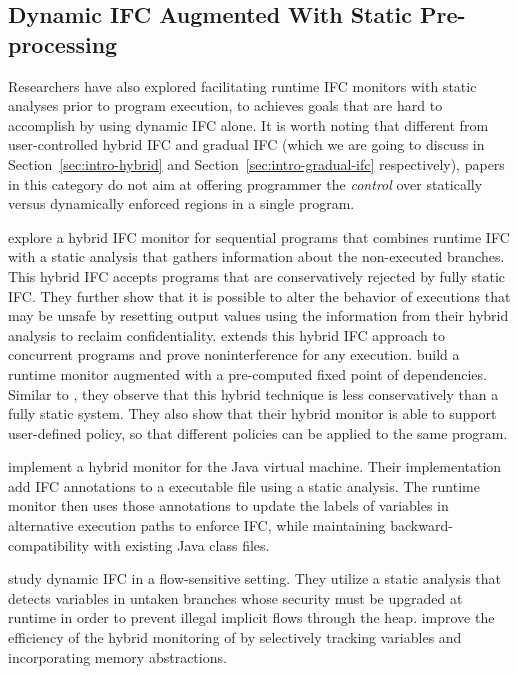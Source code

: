 \subsection{Dynamic IFC Augmented With Static Pre-processing}
\label{sec:intro-dyn-static}

Researchers have also explored facilitating runtime IFC monitors with static
analyses prior to program execution, to achieves goals that are hard to
accomplish by using dynamic IFC alone. It is worth noting that different from
user-controlled hybrid IFC and gradual IFC (which we are going to discuss in
Section~\ref{sec:intro-hybrid} and Section~\ref{sec:intro-gradual-ifc}
respectively), papers in this category do not aim at offering programmer the
\emph{control} over statically versus dynamically enforced regions in a single
program.

\textcite{le2005monitoring} explore a
hybrid IFC monitor for sequential programs that combines runtime IFC with a
static analysis that gathers information about the non-executed branches. This
hybrid IFC accepts programs that are conservatively rejected by fully static
IFC. They further show that it is possible to alter the behavior of executions
that may be unsafe by resetting output values using the information from their
hybrid analysis to reclaim confidentiality. \textcite{le2007automaton} extends
this hybrid IFC approach to concurrent programs and prove noninterference for
any execution. \textcite{Shroff:2007tg} build a runtime monitor augmented with a
pre-computed fixed point of dependencies. Similar to
\textcite{le2005monitoring}, they observe that this hybrid technique is less
conservatively than a fully static system. They also show that their hybrid
monitor is able to support user-defined policy, so that different policies can
be applied to the same program.

\textcite{Chandra:2007we} implement a hybrid monitor for the Java virtual
machine. Their implementation add IFC annotations to a executable file using a
static analysis. The runtime monitor then uses those annotations to update the
labels of variables in alternative execution paths to enforce IFC, while
maintaining backward-compatibility with existing Java class files.

\textcite{russo2010dynamic} study dynamic IFC in a flow-sensitive setting. They
utilize a static analysis that detects variables in untaken branches whose
security must be upgraded at runtime in order to prevent illegal implicit flows
through the heap. \textcite{moore2011static} improve the efficiency of the
hybrid monitoring of \textcite{russo2010dynamic} by selectively tracking
variables and incorporating memory abstractions.

